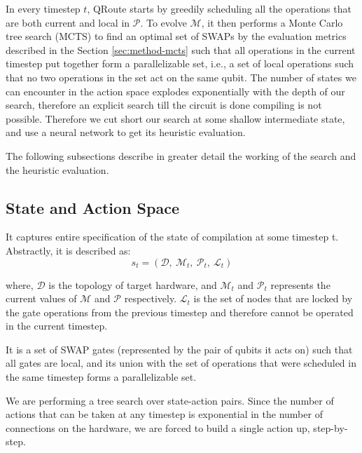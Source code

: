 In every timestep $t$, QRoute starts by greedily scheduling all the operations that are both current and local in $\mathcal{P}$. To evolve $\mathcal{M}$, it then performs a Monte Carlo tree search (MCTS) to find an optimal set of SWAPs by the evaluation metrics described in the Section \ref{sec:method-mcts} such that all operations in the current timestep put together form a parallelizable set, i.e., a set of local operations such that no two operations in the set act on the same qubit. The number of states we can encounter in the action space explodes exponentially with the depth of our search, therefore an explicit search till the circuit is done compiling is not possible. Therefore we cut short our search at some shallow intermediate state, and use a neural network to get its heuristic evaluation.


The following subsections describe in greater detail the working of the search and the heuristic evaluation.

\subsection{\label{sec:method-state} State and Action Space}

\begin{defn}[State]
    It captures entire specification of the state of compilation at some timestep t. Abstractly, it is described as:
    \begin{equation}
        s_{t} = (\mathcal{D}, \ \mathcal{M}_{t},\ \mathcal{P}_{t},\ \mathcal{L}_{t})
    \end{equation}

    where, $\mathcal{D}$ is the topology of target hardware, and $\mathcal{M}_t$ and $\mathcal{P}_t$ represents the current values of $\mathcal{M}$ and $\mathcal{P}$ respectively. $\mathcal{L}_{t}$ is the set of nodes that are locked by the gate operations from the previous timestep and therefore cannot be operated in the current timestep. 
\end{defn}


\begin{defn}[Action]
    It is a set of SWAP gates (represented by the pair of qubits it acts on) such that all gates are local, and its union with the set of operations that were scheduled in the same timestep forms a parallelizable set.
\end{defn}

We are performing a tree search over state-action pairs. Since the number of actions that can be taken at any timestep is exponential in the number of connections on the hardware, we are forced to build a single action up, step-by-step. 

